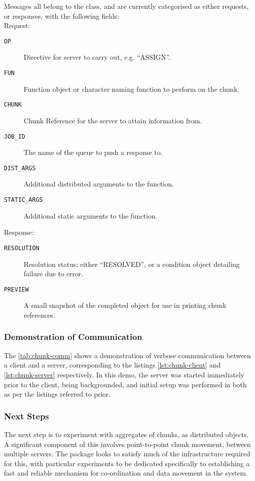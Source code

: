 Messages all belong to the  class, and are currently categorised as
either requests, or responses, with the following fields:\\

Request:
\begin{description}
	\item[\texttt{OP}] Directive for server to carry out, e.g. ``ASSIGN''.
	\item[\texttt{FUN}] Function object or character naming function to
		perform on the chunk.
	\item[\texttt{CHUNK}] Chunk Reference for the server to attain
		information from.
	\item[\texttt{JOB\_ID}] The name of the queue to push a response to.
	\item[\texttt{DIST\_ARGS}] Additional distributed arguments to the
		function.
	\item[\texttt{STATIC\_ARGS}] Additional static arguments to the
		function.
\end{description}

Response:
\begin{description}
	\item[\texttt{RESOLUTION}] Resolution status; either ``RESOLVED'', or a
		condition object detailing failure due to error.
	\item[\texttt{PREVIEW}]  A small snapshot of the completed object for
		use in printing chunk references.
\end{description}

\subsubsection{Demonstration of Communication}

The \cref{tab:chunk-comm} shows a demonstration of verbose communication
between a client and a server, corresponding to the listings
\cref{lst:chunk-client} and \cref{lst:chunk-server} respectively.
In this demo, the server was started immediately prior to the client, being
backgrounded, and initial setup was performed in both as per the listings
referred to prior.



\subsubsection{Next Steps}

The next step is to experiment with aggregates of chunks, as distributed objects.
A significant component of this involves point-to-point chunk movement, between multiple servers.
The package  looks to satisfy much of the infrastructure required for
this, with particular experiments to be dedicated specifically to establishing
a fast and reliable mechanism for co-ordination and data movement in the system.

